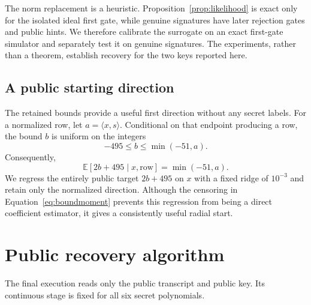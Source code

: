 \documentclass[11pt,a4paper]{article}
\newcommand{\E}{\mathbb{E}}
\begin{document}
The norm replacement is a heuristic.  Proposition~\ref{prop:likelihood} is
exact only for the isolated ideal first gate, while genuine signatures have
later rejection gates and public hints.  We therefore calibrate the surrogate
on an exact first-gate simulator and separately test it on genuine signatures.
The experiments, rather than a theorem, establish recovery for the two keys
reported here.

\subsection{A public starting direction}

The retained bounds provide a useful first direction without any secret
labels.  For a normalized row, let $a=\langle x,s\rangle$.  Conditional on
that endpoint producing a row, the bound $b$ is uniform on the integers
\[
                       -495\le b\le\min(-51,a).
\]
Consequently,
\begin{equation}
              \E[2b+495\mid x,\text{row}]=\min(-51,a).
\label{eq:boundmoment}
\end{equation}
We regress the entirely public target $2b+495$ on $x$ with a fixed ridge of
$10^{-3}$ and retain only the normalized direction.  Although the censoring
in Equation~\eqref{eq:boundmoment} prevents this regression from being a
direct coefficient estimator, it gives a consistently useful radial start.

\section{Public recovery algorithm}
\label{sec:algorithm}

The final execution reads only the public transcript and public key.  Its
continuous stage is fixed for all six secret polynomials.
\end{document}
